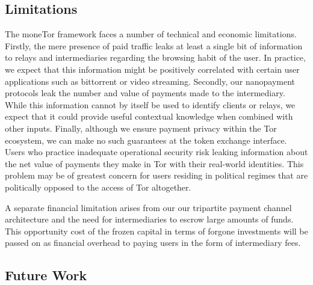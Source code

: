 \subsection{Limitations}
\label{subsec:limitations}

The moneTor framework faces a number of technical and economic
limitations. Firstly, the mere presence of paid traffic leaks at least a single
bit of information to relays and intermediaries regarding the browsing habit of
the user. In practice, we expect that this information might be positively
correlated with certain user applications such as bittorrent or video
streaming. Secondly, our nanopayment protocols leak the number and value of
payments made to the intermediary. While this information cannot by itself be
used to identify clients or relays, we expect that it could provide useful
contextual knowledge when combined with other inputs. Finally, although we
ensure payment privacy within the Tor ecosystem, we can make no such guarantees
at the token exchange interface. Users who practice inadequate operational
security risk leaking information about the net value of payments they make in
Tor with their real-world identities. This problem may be of greatest concern for
users residing in political regimes that are politically opposed to the access
of Tor altogether.

A separate financial limitation arises from our our tripartite payment channel
architecture and the need for intermediaries to escrow large amounts of
funds. This opportunity cost of the frozen capital in terms of forgone
investments will be passed on as financial overhead to paying users in the form
of intermediary fees.

\subsection{Future Work}
\label{subsec:future_work}


